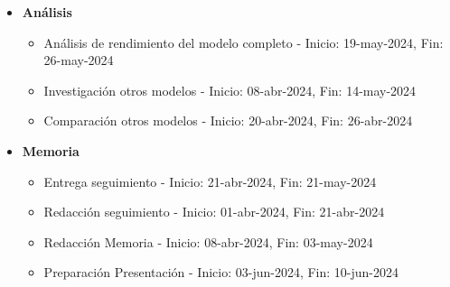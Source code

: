 \begin{itemize}
    \item \textbf{Análisis}
    \begin{itemize}
        \item Análisis de rendimiento del modelo completo - Inicio: 19-may-2024, Fin: 26-may-2024
        \item Investigación otros modelos - Inicio: 08-abr-2024, Fin: 14-may-2024
        \item Comparación otros modelos - Inicio: 20-abr-2024, Fin: 26-abr-2024
    \end{itemize}
    \item \textbf{Memoria}
    \begin{itemize}
        \item Entrega seguimiento - Inicio: 21-abr-2024, Fin: 21-may-2024
        \item Redacción seguimiento - Inicio: 01-abr-2024, Fin: 21-abr-2024
        \item Redacción Memoria - Inicio: 08-abr-2024, Fin: 03-may-2024
        \item Preparación Presentación - Inicio: 03-jun-2024, Fin: 10-jun-2024
    \end{itemize}
\end{itemize}